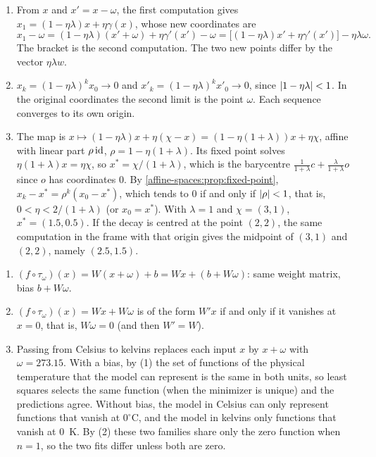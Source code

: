 \begin{enumerate}[nosep]
  \item From $x$ and $x' = x - \omega$, the first computation gives
        $x_1 = (1 - \eta\lambda)x + \eta\gamma(x)$, whose new coordinates
        are
        \[
          x_1 - \omega = (1 - \eta\lambda)(x' + \omega) + \eta\gamma'(x')
          - \omega
          = \bigl[(1 - \eta\lambda)x' + \eta\gamma'(x')\bigr]
          - \eta\lambda\omega .
        \]
        The bracket is the second computation. The two new points differ
        by the vector $\eta\lambda w$.
  \item $x_k = (1 - \eta\lambda)^kx_0\to0$ and
        $x'_k = (1 - \eta\lambda)^kx'_0\to0$, since
        $\left|1 - \eta\lambda\right| < 1$. In the original coordinates the
        second limit is the point $\omega$. Each sequence converges to its
        own origin.
  \item The map is
        $x\mapsto(1 - \eta\lambda)x + \eta(\chi - x)
        = (1 - \eta(1 + \lambda))x + \eta\chi$, affine with linear part
        $\rho\,\mathrm{id}$, $\rho = 1 - \eta(1 + \lambda)$. Its fixed point solves
        $\eta(1 + \lambda)x = \eta\chi$, so $x^* = \chi/(1 + \lambda)$,
        which is the barycentre $\frac1{1 + \lambda}c
        + \frac\lambda{1 + \lambda}o$ since $o$ has coordinates $0$. By
        \cref{affine-spaces:prop:fixed-point},
        $x_k - x^* = \rho^k(x_0 - x^*)$, which tends to $0$ if and only if
        $\left|\rho\right| < 1$, that is, $0 < \eta < 2/(1 + \lambda)$ (or
        $x_0 = x^*$). With $\lambda = 1$ and $\chi = (3, 1)$,
        $x^* = (1.5, 0.5)$. If the decay is centred at the point $(2, 2)$,
        the same computation in the frame with that origin gives the
        midpoint of $(3, 1)$ and $(2, 2)$, namely $(2.5, 1.5)$.
\end{enumerate}

\begin{enumerate}[nosep]
  \item $(f\circ\tau_\omega)(x) = W(x + \omega) + b = Wx + (b + W\omega)$:
        same weight matrix, bias $b + W\omega$.
  \item $(f\circ\tau_\omega)(x) = Wx + W\omega$ is of the form $W'x$ if and
        only if it vanishes at $x = 0$, that is, $W\omega = 0$ (and then
        $W' = W$).
  \item Passing from Celsius to kelvins replaces each input $x$ by
        $x + \omega$ with $\omega = 273.15$. With a bias, by (1) the set
        of functions of the physical temperature that the model can
        represent is the same in both units, so least squares selects the
        same function (when the minimizer is unique) and the predictions
        agree. Without bias, the model in Celsius can only represent
        functions that vanish at $0^\circ$C, and the model in kelvins only
        functions that vanish at $0$~K. By (2) these two families share
        only the zero function when $n = 1$, so the two fits differ
        unless both are zero.
\end{enumerate}

